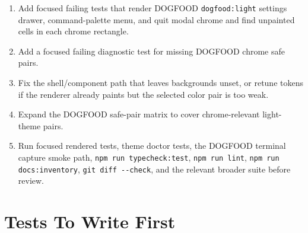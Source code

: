 \begin{enumerate}
\def\labelenumi{\arabic{enumi}.}
\tightlist
\item
  Add focused failing tests that render DOGFOOD \texttt{d\allowbreak{}o\allowbreak{}g\allowbreak{}f\allowbreak{}o\allowbreak{}o\allowbreak{}d\allowbreak{}:\allowbreak{}l\allowbreak{}i\allowbreak{}g\allowbreak{}h\allowbreak{}t} settings drawer, command-palette menu, and quit modal chrome and find unpainted cells in each chrome rectangle.
\item
  Add a focused failing diagnostic test for missing DOGFOOD chrome safe pairs.
\item
  Fix the shell/component path that leaves backgrounds unset, or retune tokens if the renderer already paints but the selected color pair is too weak.
\item
  Expand the DOGFOOD safe-pair matrix to cover chrome-relevant light-theme pairs.
\item
  Run focused rendered tests, theme doctor tests, the DOGFOOD terminal capture smoke path, \texttt{n\allowbreak{}p\allowbreak{}m\allowbreak{} \allowbreak{}r\allowbreak{}u\allowbreak{}n\allowbreak{} \allowbreak{}t\allowbreak{}y\allowbreak{}p\allowbreak{}e\allowbreak{}c\allowbreak{}h\allowbreak{}e\allowbreak{}c\allowbreak{}k\allowbreak{}:\allowbreak{}t\allowbreak{}e\allowbreak{}s\allowbreak{}t}, \texttt{n\allowbreak{}p\allowbreak{}m\allowbreak{} \allowbreak{}r\allowbreak{}u\allowbreak{}n\allowbreak{} \allowbreak{}l\allowbreak{}i\allowbreak{}n\allowbreak{}t}, \texttt{n\allowbreak{}p\allowbreak{}m\allowbreak{} \allowbreak{}r\allowbreak{}u\allowbreak{}n\allowbreak{} \allowbreak{}d\allowbreak{}o\allowbreak{}c\allowbreak{}s\allowbreak{}:\allowbreak{}i\allowbreak{}n\allowbreak{}v\allowbreak{}e\allowbreak{}n\allowbreak{}t\allowbreak{}o\allowbreak{}r\allowbreak{}y}, \texttt{g\allowbreak{}i\allowbreak{}t\allowbreak{} \allowbreak{}d\allowbreak{}i\allowbreak{}f\allowbreak{}f\allowbreak{} \allowbreak{}-\allowbreak{}-\allowbreak{}c\allowbreak{}h\allowbreak{}e\allowbreak{}c\allowbreak{}k}, and the relevant broader suite before review.
\end{enumerate}

\section{Tests To Write First}\label{record-182-tests-to-write-first}


